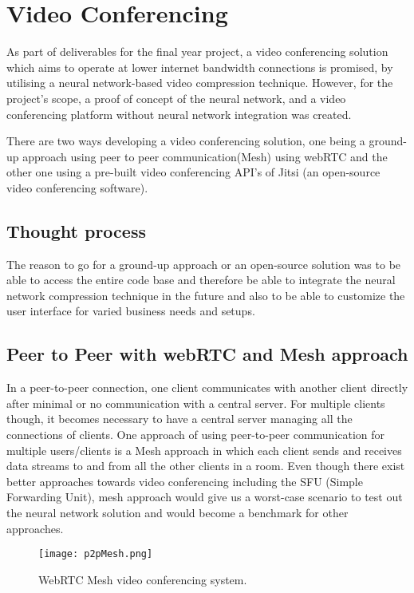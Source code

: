 \section{Video Conferencing}
As part of deliverables for the final year project, a video conferencing solution which aims to operate at 
lower internet bandwidth connections is promised, by utilising a neural network-based video compression technique. 
However, for the project's scope, a proof of concept of the neural network, and a video 
conferencing platform without neural network integration was created.

There are two ways developing a video conferencing solution, one being a ground-up approach using peer 
to peer communication(Mesh) using webRTC and the other one using a pre-built video conferencing API’s of Jitsi 
(an open-source video conferencing software).

\subsection{Thought process}

The reason to go for a ground-up approach or an open-source solution was to be able to access the entire code 
base and therefore be able to integrate the neural network compression technique in the future and also to be able to
customize the user interface for varied business needs and setups.

\subsection{ Peer to Peer with webRTC and Mesh approach}
In a peer-to-peer connection, one client communicates with another client directly after minimal or no communication with a central server.
For multiple clients though, it becomes necessary to have a central server managing all the connections of clients.
One approach of using peer-to-peer communication for multiple users/clients is a Mesh approach in which each client sends and receives data streams to and from all the other clients in a room.
Even though there exist better approaches towards video conferencing including the SFU (Simple Forwarding Unit), 
mesh approach would give us a worst-case scenario to test out the neural network solution and would become a benchmark for other approaches.

\begin{figure}
    \begin{center}
        \texttt{[image: p2pMesh.png]}
    \end{center}
    \caption{WebRTC Mesh video conferencing system.}
    \label{fig:p2pMesh}
\end{figure}

